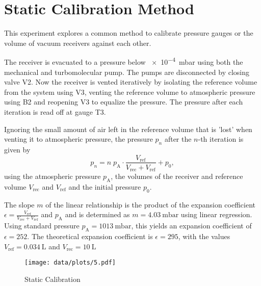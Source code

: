 \chapter{Static Calibration Method}

This experiment explores a common method to calibrate pressure gauges or the volume of vacuum receivers against each other.

The receiver is evacuated to a pressure below \SI{e-4}{\milli\bar} using both the mechanical and turbomolecular pump.
The pumps are disconnected by closing valve V2.
Now the receiver is vented iteratively by isolating the reference volume from the system using V3, venting the reference volume to atmospheric pressure using B2 and reopening V3 to equalize the pressure.
The pressure after each iteration is read off at gauge T3.

Ignoring the small amount of air left in the reference volume that is 'lost' when venting it to atmospheric pressure, the pressure $p_n$ after the $n$-th iteration is given by
\begin{equation}
	p_n = n \; p_\text{A} \cdot \frac{V_\text{ref}}{V_\text{rec} + V_\text{ref}} + p_0,
\end{equation}
using the atmospheric pressure $p_\text{A}$, the volumes of the receiver and reference volume $V_\text{rec}$ and $V_\text{ref}$ and the initial pressure $p_0$.

The slope $m$ of the linear relationship is the product of the expansion coefficient $\epsilon = \frac{V_\text{ref}}{V_\text{rec} + V_\text{ref}}$ and $p_\text{A}$ and is determined as $m = \SI{4.03}{\milli\bar}$ using linear regression.
Using standard pressure $p_\text{A} = \SI{1013}{\milli\bar}$, this yields an expansion coefficient of $\epsilon = \num{252}$.
The theoretical expansion coefficient is $\epsilon = \num{295}$, with the values $V_\text{ref} = \SI{0.034}{\liter}$ and $V_\text{rec} = \SI{10}{\liter}$


\begin{figure}[b!]
	\centering
	\texttt{[image: data/plots/5.pdf]}
	\caption{Static Calibration}
	\label{fig:static-cal}
\end{figure}
